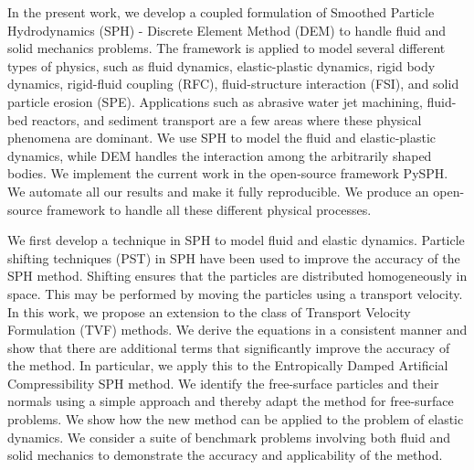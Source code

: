 \begin{Abstract}
  In the present work, we develop a coupled formulation of Smoothed Particle
  Hydrodynamics (SPH) - Discrete Element Method (DEM) to handle fluid and solid
  mechanics problems. The framework is applied to model several different types
  of physics, such as fluid dynamics, elastic-plastic dynamics, rigid body
  dynamics, rigid-fluid coupling (RFC), fluid-structure interaction (FSI), and
  solid particle erosion (SPE). Applications such as abrasive water jet
  machining, fluid-bed reactors, and sediment transport are a few areas where
  these physical phenomena are dominant. We use SPH to model the fluid and
  elastic-plastic dynamics, while DEM handles the interaction among the
  arbitrarily shaped bodies. We implement the current work in the open-source
  framework PySPH. We automate all our results and make it fully reproducible.
  We produce an open-source framework to handle all these different physical
  processes.


  We first develop a technique in SPH to model fluid and elastic dynamics.
  Particle shifting techniques (PST) in SPH have been used to improve the
  accuracy of the SPH method. Shifting ensures that the particles are
  distributed homogeneously in space. This may be performed by moving the
  particles using a transport velocity. In this work, we propose an extension
  to the class of Transport Velocity Formulation (TVF) methods. We derive the
  equations in a consistent manner and show that there are additional terms that
  significantly improve the accuracy of the method. In particular, we apply this
  to the Entropically Damped Artificial Compressibility SPH method. We identify
  the free-surface particles and their normals using a simple approach and
  thereby adapt the method for free-surface problems. We show how the new method
  can be applied to the problem of elastic dynamics. We consider a suite of
  benchmark problems involving both fluid and solid mechanics to demonstrate the
  accuracy and applicability of the method.


\end{Abstract}
